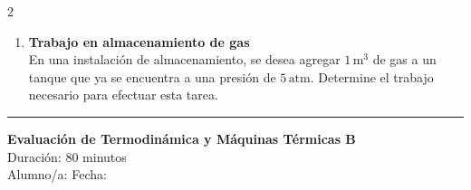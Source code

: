 \documentclass[a4paper,12pt]{article}
\begin{document}
\begin{multicols}{2}
\begin{enumerate}
\vspace{0.3cm}

\item \textbf{Trabajo en almacenamiento de gas} \\
En una instalación de almacenamiento, se desea agregar $1\,\text{m}^3$ de gas a un tanque que ya se encuentra a una presión de $5\,\text{atm}$. Determine el trabajo necesario para efectuar esta tarea.

\end{enumerate}
\end{multicols}

\vspace{1cm}
\hrule
\vspace{1cm}


\begin{center}
    \Large \textbf{Evaluación de Termodinámica y Máquinas Térmicas B} \\
    \normalsize Duración: 80 minutos \\
    Alumno/a: \underline{\hspace{6cm}} \hspace{0.5cm} Fecha: \underline{\hspace{2cm}}
\end{center}

\vspace{0.3cm}
\end{document}

